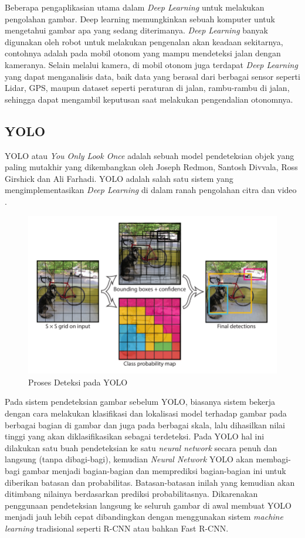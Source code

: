 Beberapa pengaplikasian utama dalam \emph{Deep Learning} untuk melakukan pengolahan gambar. Deep learning memungkinkan sebuah komputer untuk mengetahui gambar apa yang sedang diterimanya. \emph{Deep Learning} banyak digunakan oleh robot untuk melakukan pengenalan akan keadaan sekitarnya, contohnya adalah pada mobil otonom yang mampu mendeteksi jalan dengan kameranya. Selain melalui kamera, di mobil otonom juga terdapat \emph{Deep Learning} yang dapat menganalisis data, baik data yang berasal dari berbagai sensor seperti Lidar, GPS, maupun dataset seperti peraturan di jalan, rambu-rambu di jalan, sehingga dapat mengambil keputusan saat melakukan pengendalian otonomnya.

\subsection{YOLO}
YOLO atau \emph{You Only Look Once} adalah sebuah model pendeteksian objek yang paling mutakhir yang dikembangkan oleh Joseph Redmon, Santosh Divvala, Ross Girshick dan Ali Farhadi. YOLO adalah salah satu sistem yang mengimplementasikan \emph{Deep Learning} di dalam ranah pengolahan citra dan video \cite{RedmonYOLO}.
\begin{figure} [H] \centering
  \includegraphics[scale=0.5]{gambar/yolo_method.png}
  \caption{Proses Deteksi pada YOLO}
  \label{fig:yolo_detection}
\end{figure}

Pada sistem pendeteksian gambar sebelum YOLO, biasanya sistem bekerja dengan cara melakukan klasifikasi dan lokalisasi model terhadap gambar pada berbagai bagian di gambar dan juga pada berbagai skala, lalu dihasilkan nilai tinggi yang akan diklasifikasikan sebagai terdeteksi. Pada YOLO hal ini dilakukan satu buah pendeteksian ke satu \emph{neural network} secara penuh dan langsung (tanpa dibagi-bagi), kemudian \emph{Neural Network} YOLO akan membagi-bagi gambar menjadi bagian-bagian dan memprediksi bagian-bagian ini untuk diberikan batasan dan probabilitas. Batasan-batasan inilah yang kemudian akan ditimbang nilainya berdasarkan prediksi probabilitasnya. Dikarenakan penggunaan pendeteksian langsung ke seluruh gambar di awal membuat YOLO menjadi jauh lebih cepat dibandingkan dengan menggunakan sistem \emph{machine learning} tradisional seperti R-CNN atau bahkan Fast R-CNN. 


